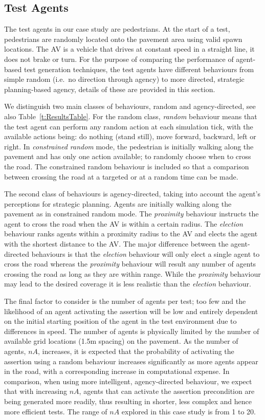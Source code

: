 \documentclass[runningheads,a4paper]{llncs}
\begin{document}
\subsection{Test Agents}

The test agents in our case study are pedestrians. At the start of a test, pedestrians are randomly located onto the pavement area using valid spawn locations. The AV is a vehicle that drives at constant speed in a straight line, it does not brake or turn. For the purpose of comparing the performance of agent-based test generation techniques, the test agents have different behaviours from simple random (i.e.\ no direction through agency) to more directed, strategic planning-based agency, details of these are provided in this section.

We distinguish two main classes of behaviours, random and agency-directed, see also Table~\ref{t:ResultsTable}. For the random class, \textit{random} behaviour means that the test agent can perform any random action at each simulation tick, with the available actions being: do nothing (stand still), move forward, backward, left or right. In \textit{constrained random} mode, the pedestrian is initially walking along the pavement and has only one action available; to randomly choose when to cross the road. The constrained random behaviour is included so that a comparison between crossing the road at a targeted or at a random time can be made. 

The second class of behaviours is agency-directed, taking into account the agent's perceptions for strategic planning. Agents are initially walking along the pavement as in constrained random mode. The \textit{proximity} behaviour instructs the agent to cross the road when the AV is within a certain radius. The \textit{election} behaviour ranks agents within a proximity radius to the AV and elects the agent with the shortest distance to the AV. The major difference between the agent-directed behaviours is that the \textit{election} behaviour will only elect a single agent to cross the road whereas the \textit{proximity} behaviour will result any number of agents crossing the road as long as they are within range.  While the \textit{proximity} behaviour may lead to the desired coverage it is less realistic than the \textit{election} behaviour. 


The final factor to consider is the number of agents per test; too few and the likelihood of an agent activating the assertion will be low and entirely dependent on the initial starting position of the agent in the test environment due to differences in speed. The number of agents is physically limited by the number of available grid locations (1.5m spacing) on the pavement. As the number of agents, $nA$, increases, it is expected that the probability of activating the assertion using a random behaviour increases significantly as more agents appear in the road, with a corresponding increase in computational expense. In comparison, when using more intelligent, agency-directed behaviour, we expect that with increasing $nA$, agents that can activate the assertion precondition are being generated more readily, thus resulting in shorter, less complex and hence more efficient tests. The range of $nA$ explored in this case study is from 1 to 20.
\end{document}

